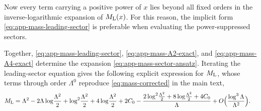 \documentclass[a4paper,11pt]{article}
\begin{document}
Now every term carrying a positive power of $x$ lies beyond all fixed
orders in the inverse-logarithmic expansion of $M_{\rm L}(x)$.  For
this reason, the implicit form \eqref{eq:app-mass-leading-sector} is
preferable when evaluating the power-suppressed sectors.

Together, \eqref{eq:app-mass-leading-sector},
\eqref{eq:app-mass-A2-exact}, and \eqref{eq:app-mass-A4-exact}
determine the expansion \eqref{eq:app-mass-sector-ansatz}. Iterating
the leading-sector equation gives the following explicit expression
for $M_{\rm L}$, whose terms through order $\Lambda^0$ reproduce
\eqref{eq:mass-corrected} in the main text,
\begin{align}
	M_{\rm L}
	={}&
	\Lambda^2
	-2\Lambda\log\!\frac{\Lambda^2}{2}
	+\log^2\!\frac{\Lambda^2}{2}
	+4\log\!\frac{\Lambda^2}{2}
	+2C_0
	-
	\frac{
		2\log^2\!\frac{\Lambda^2}{2}
		+8\log\!\frac{\Lambda^2}{2}
		+4C_0
	}{\Lambda}
	+O\Big(
	\frac{\log^3\Lambda}{\Lambda^2}
	\Big).
	\label{eq:app-mass-ML-explicit}
\end{align}




\end{document}
